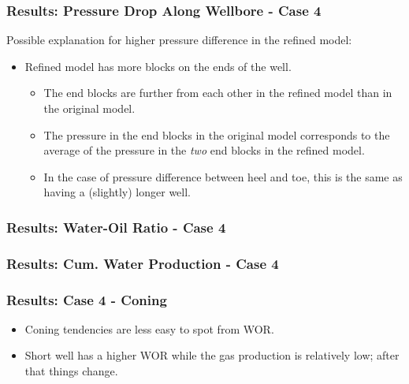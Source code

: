 \begin{frame}
    \frametitle{Results: Pressure Drop Along Wellbore - Case 4}
    Possible explanation for higher pressure difference in the refined model:
    \begin{itemize}
        \item Refined model has more blocks on the ends of the well.
        \begin{itemize}
            \item The end blocks are further from each other in the refined model than in the original model.
            \item The pressure in the end blocks in the original model corresponds to the average of the pressure in the \emph{two} end blocks in the refined model.
            \item In the case of pressure difference between heel and toe, this is the same as having a (slightly) longer well.
        \end{itemize}
    \end{itemize}
\end{frame}


\begin{frame}
    \frametitle{Results: Water-Oil Ratio - Case 4}
    \centerline{}
\end{frame}

\begin{frame}
    \frametitle{Results: Cum. Water Production - Case 4}
    \centerline{}
\end{frame}

\begin{frame}
    \frametitle{Results: Case 4 - Coning}
    \begin{itemize}
        \item Coning tendencies are less easy to spot from WOR.
        \item Short well has a higher WOR while the gas production is relatively low; after that things change.
    \end{itemize}
\end{frame}
